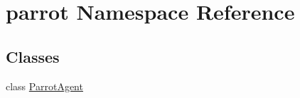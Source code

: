 \hypertarget{namespaceparrot}{}\section{parrot Namespace Reference}
\label{namespaceparrot}
\subsection*{Classes}
\begin{DoxyCompactItemize}
\item 
class \hyperlink{classparrot_1_1ParrotAgent}{Parrot\+Agent}
\end{DoxyCompactItemize}
